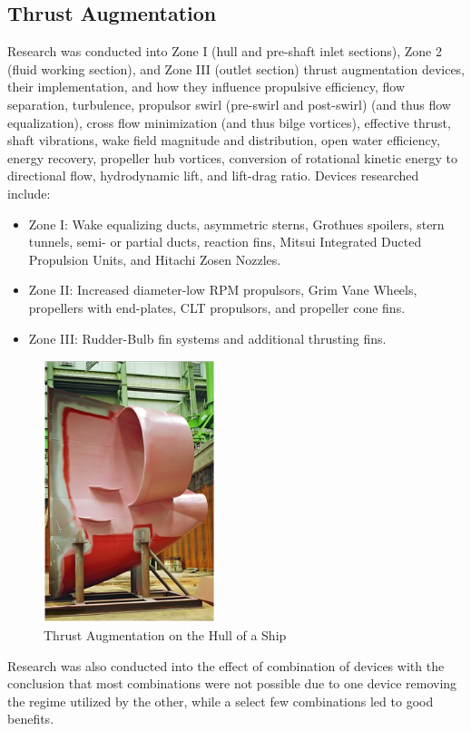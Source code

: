 \documentclass{report}
\begin{document}
\subsection{Thrust Augmentation}
Research was conducted into Zone I (hull and pre-shaft inlet sections), Zone 2 (fluid working section), and Zone III (outlet section) thrust augmentation devices, their implementation, and how they influence propulsive efficiency, flow separation, turbulence, propulsor swirl (pre-swirl and post-swirl) (and thus flow equalization), cross flow minimization (and thus bilge vortices), effective thrust, shaft vibrations, wake field magnitude and distribution, open water efficiency, energy recovery, propeller hub vortices, conversion of rotational kinetic energy to directional flow, hydrodynamic lift, and lift-drag ratio.  Devices researched include:
\begin{itemize}
\item Zone I: Wake equalizing ducts, asymmetric sterns, Grothues spoilers, stern tunnels, semi- or partial ducts, reaction fins, Mitsui Integrated Ducted Propulsion Units, and Hitachi Zosen Nozzles.
\item Zone II: Increased diameter-low RPM propulsors, Grim Vane Wheels, propellers with end-plates, CLT propulsors, and propeller cone fins.
\item Zone III: Rudder-Bulb fin systems and additional thrusting fins.
\end{itemize}
\begin{figure}[h]
\centering
\includegraphics[width=5cm]{"Thrust Augmentation"}
\caption{Thrust Augmentation on the Hull of a Ship}
\end{figure}
\indent Research was also conducted into the effect of combination of devices with the conclusion that most combinations were not possible due to one device removing the regime utilized by the other, while a select few combinations led to good benefits.
\end{document}
